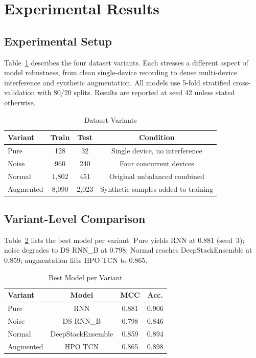 \section{Experimental Results}

\subsection{Experimental Setup}

Table~\ref{tab:variants} describes the four dataset variants. Each stresses a different aspect of model robustness, from clean single-device recording to dense multi-device interference and synthetic augmentation. All models use 5-fold stratified cross-validation with 80/20 splits. Results are reported at seed 42 unless stated otherwise.

\begin{table}
    \centering
    \caption{Dataset Variants}
    \label{tab:variants}
    \begin{tabular}{lccc}\toprule
        Variant   & Train & Test  & Condition                           \\\midrule
        Pure      & 128   & 32    & Single device, no interference      \\
        Noise     & 960   & 240   & Four concurrent devices             \\
        Normal    & 1,802 & 451   & Original unbalanced combined        \\
        Augmented & 8,090 & 2,023 & Synthetic samples added to training \\\bottomrule
    \end{tabular}
\end{table}

\subsection{Variant-Level Comparison}

Table~\ref{tab:variant_best} lists the best model per variant. Pure yields RNN at 0.881 (seed~3); noise degrades to DS RNN\_B at 0.798; Normal reaches DeepStackEnsemble at 0.859; augmentation lifts HPO TCN to 0.865.

\begin{table}
    \centering
    \caption{Best Model per Variant}
    \label{tab:variant_best}
    \begin{tabular}{lccc}\toprule
        Variant   & Model             & MCC   & Acc.  \\\midrule
        Pure      & RNN               & 0.881 & 0.906 \\
        Noise     & DS RNN\_B         & 0.798 & 0.846 \\
        Normal    & DeepStackEnsemble & 0.859 & 0.894 \\
        Augmented & HPO TCN           & 0.865 & 0.898 \\\bottomrule
    \end{tabular}
\end{table}

